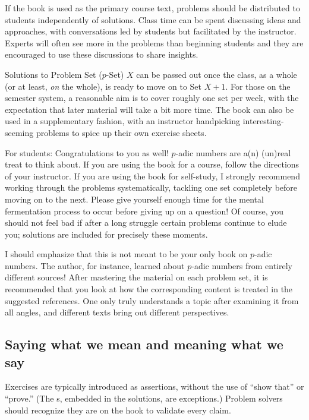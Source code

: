 If the book is used as the primary course text, problems should be distributed to students independently of solutions. Class time can be spent discussing ideas and approaches, with conversations led by students but facilitated by the instructor. Experts will often see more in the problems than beginning students and they are encouraged to use these discussions to share insights.

Solutions to Problem Set ($p$-Set) $X$ can be passed out once the class, as a whole (or at least, \emph{on} the whole), is ready to move on to Set $X+1$. For those on the semester system, a reasonable aim is to cover roughly one set per week, with the expectation that later material will take a bit more time. The book can also be used in a supplementary fashion, with an instructor handpicking interesting-seeming problems to spice up their own exercise sheets. 

For students: Congratulations to you as well! $p$-adic numbers are a(n) (un)real treat to think about. If you are using the book for a course, follow the directions of your instructor. If you are using the book for self-study, I strongly recommend working through the problems systematically, tackling one set completely before moving on to the next. Please give yourself enough time for the mental fermentation process to occur before giving up on a question! Of course, you should not feel bad if after a long struggle certain problems continue to elude you; solutions are included for precisely these moments. 

I should emphasize that this is not meant to be your only book on $p$-adic numbers. The author, for instance, learned about $p$-adic numbers from entirely different sources! After mastering the material on each problem set, it is recommended that you look at how the corresponding content is treated in the suggested references. One only truly understands a topic after examining it from all angles, and different texts bring out different perspectives.


\subsection*{Saying what we mean and meaning what we say} %
Exercises are typically introduced as assertions, without the use of ``show that'' or ``prove.'' (The \textsf{\pp s}, embedded in the solutions, are exceptions.) Problem solvers should recognize they are on the hook to validate every claim.

